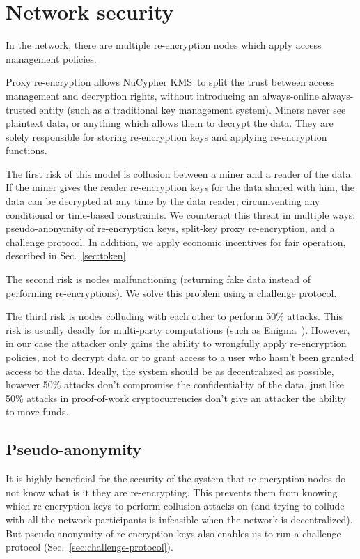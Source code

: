 \documentclass[notitlepage,longbibliography]{revtex4-1}
\newcommand{\kms}{NuCypher KMS}
\begin{document}
\section{Network security}

In the network, there are multiple re-encryption nodes which apply access management policies.

Proxy re-encryption allows \kms~to split the trust between access management and decryption rights,
without introducing an always-online always-trusted entity (such as a traditional key management system).
Miners never see plaintext data, or anything which allows them to decrypt the data.
They are solely responsible for storing re-encryption keys and applying re-encryption functions.

The first risk of this model is collusion between a miner and a reader of the data.
If the miner gives the reader re-encryption keys for the data shared with him,
the data can be decrypted at any time by the data reader, circumventing any conditional or time-based constraints.
We counteract this threat in multiple ways: pseudo-anonymity of re-encryption keys, split-key proxy re-encryption, and a challenge protocol.
In addition, we apply economic incentives for fair operation, described in Sec.~\ref{sec:token}.

The second risk is nodes malfunctioning (returning fake data instead of performing re-encryptions).
We solve this problem using a challenge protocol.

The third risk is nodes colluding with each other to perform 50\% attacks.
This risk is usually deadly for multi-party computations (such as Enigma~\cite{enigma}). However, in our case the attacker only gains the ability to wrongfully apply re-encryption policies, not to decrypt data or to grant access to a user who hasn't been granted access to the data.
Ideally, the system should be as decentralized as possible, however 50\% attacks don't compromise the confidentiality of the data, just like 50\% attacks in
proof-of-work cryptocurrencies don't give an attacker the ability to move funds.

\subsection{Pseudo-anonymity}

It is highly beneficial for the security of the system that re-encryption nodes do not know what is it they are re-encrypting.
This prevents them from knowing which re-encryption keys to perform collusion attacks on (and trying to collude with all the network participants
is infeasible when the network is decentralized).
But pseudo-anonymity of re-encryption keys also enables us to run a challenge protocol (Sec.~\ref{sec:challenge-protocol}).
\end{document}
